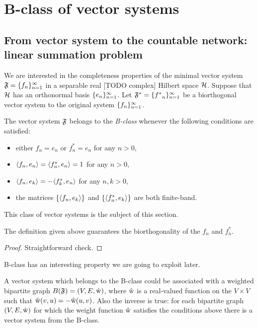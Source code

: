 \documentclass[12pt]{article}
\begin{document}


\section{B-class of vector systems}
  \subsection{From vector system to the countable network: linear summation problem}
    \label{fsys2graphs}
    We are interested in the completeness properties of the minimal vector system $\fsys = \seq{f}$
      in a separable real [TODO complex] Hilbert space $\cal{H}$.
    Suppose that $\cal{H}$ has an orthonormal basis $\seq{e}$.
    Let $\fstarsys = \seq{f^*}$ be a biorthogonal vector system to the original system $\seq{f}$.
    \begin{definition}
        The vector system $\fsys$ belongs to the \emph{B-class} whenever the following conditions are satisfied:
        \begin{itemize}
            \item either $f_n = e_n$ or $f^*_n = e_n$ for any $n > 0$,
            \item $\inner{f_n}{e_n} = \inner{f^*_n}{e_n} = 1$ for any $n > 0$,
            \item $\inner{f_n}{e_k} = -\inner{f^*_k}{e_n}$ for any $n, k > 0$,
            \item the matrices $\{\inner{f_n}{e_k}\}$ and $\{\inner{f^*_n}{e_k}\}$ are both finite-band.
        \end{itemize}
    \end{definition}
    This class of vector systems is the subject of this section.
    \begin{prop}
        The definition given above guarantees the biorthogonality of the $f_n$ and $f^*_n$.
    \end{prop}
    \begin{proof}
        Straightforward check.
    \end{proof}
    B-class has an interesting property we are going to exploit later.
    \begin{prop}
      A vector system which belongs to the B-class could be associated with a
      weighted bipartite graph $B(\fsys) = (V, E, \wt)$, where $\wt$ is a
      real-valued function on the $V\times V$ such that $\wt(v, u) = -\wt(u, v)$.
      Also the inverse is true: for each bipartite graph $(V, E, \wt)$ for which the weight function
      $\wt$ satisfies the conditions above there is a vector system from the B-class.
    \end{prop}
\end{document}
